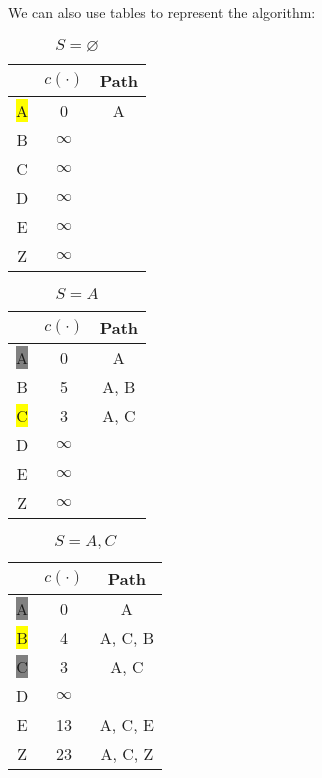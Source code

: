 \begin{eg}
  We can also use tables to represent the algorithm:

  \begin{minipage}{.3\textwidth}
  \begin{table}[H]
    \centering
    \begin{tabular}{c|c|c}
        \toprule
         & \(c(\cdot)\) & Path \\
      \midrule
      \colorbox{Yellow}{A} & 0 & A  \\
        B & \(\infty\) &   \\
        C & \(\infty\) &   \\
        D & \(\infty\) &   \\
        E & \(\infty\) &   \\
        Z & \(\infty\) &   \\
    \end{tabular}
    \caption*{\(S = \varnothing\)}
  \end{table}
\end{minipage}
\begin{minipage}{.3\textwidth}
  \begin{table}[H]
    \centering
    \begin{tabular}{c|c|c}
        \toprule
         & \(c(\cdot)\) & Path \\
      \midrule
      \colorbox{Gray}{A} & 0 & A  \\
        B & 5 & A, B  \\
        \colorbox{Yellow}{C} & 3 & A, C  \\
        D & \(\infty\) &   \\
        E & \(\infty\) &   \\
        Z & \(\infty\) &   \\
    \end{tabular}
    \caption*{\(S = A\)}
  \end{table}
\end{minipage}
\begin{minipage}{.3\textwidth}
  \begin{table}[H]
    \centering
    \begin{tabular}{c|c|c}
        \toprule
         & \(c(\cdot)\) & Path \\
      \midrule
      \colorbox{gray}{A} & 0 & A  \\
      \colorbox{Yellow}{B} & 4 & A, C, B  \\
      \colorbox{gray}{C} & 3 & A, C  \\
        D & \(\infty\) &   \\
        E & 13 & A, C, E  \\
        Z & 23 & A, C, Z  \\
    \end{tabular}
    \caption*{\(S = A, C\)}
  \end{table}
\end{minipage}


\end{eg}
